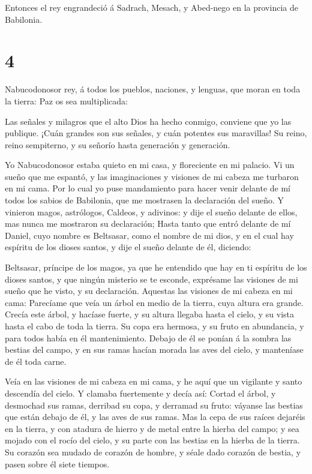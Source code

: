  Entonces el rey engrandeció á Sadrach, Mesach, y Abed-nego
en la provincia de Babilonia.

\hypertarget{section-3}{%
\section{4}\label{section-3}}

 Nabucodonosor rey, á todos los pueblos, naciones, y
lenguas, que moran en toda la tierra: Paz os sea multiplicada:

 Las señales y milagros que el alto Dios ha hecho conmigo,
conviene que yo las publique.  ¡Cuán grandes son sus
señales, y cuán potentes sus maravillas! Su reino, reino sempiterno, y
su señorío hasta generación y generación.

 Yo Nabucodonosor estaba quieto en mi casa, y floreciente en
mi palacio.  Vi un sueño que me espantó, y las imaginaciones
y visiones de mi cabeza me turbaron en mi cama.  Por lo cual
yo puse mandamiento para hacer venir delante de mí todos los sabios de
Babilonia, que me mostrasen la declaración del sueño.  Y
vinieron magos, astrólogos, Caldeos, y adivinos: y dije el sueño delante
de ellos, mas nunca me mostraron su declaración;  Hasta
tanto que entró delante de mí Daniel, cuyo nombre es Beltsasar, como el
nombre de mi dios, y en el cual hay espíritu de los dioses santos, y
dije el sueño delante de él, diciendo:

 Beltsasar, príncipe de los magos, ya que he entendido que
hay en ti espíritu de los dioses santos, y que ningún misterio se te
esconde, exprésame las visiones de mi sueño que he visto, y su
declaración.  Aquestas las visiones de mi cabeza en mi
cama: Parecíame que veía un árbol en medio de la tierra, cuya altura era
grande.  Crecía este árbol, y hacíase fuerte, y su altura
llegaba hasta el cielo, y su vista hasta el cabo de toda la tierra.
 Su copa era hermosa, y su fruto en abundancia, y para
todos había en él mantenimiento. Debajo de él se ponían á la sombra las
bestias del campo, y en sus ramas hacían morada las aves del cielo, y
manteníase de él toda carne.

 Veía en las visiones de mi cabeza en mi cama, y he aquí
que un vigilante y santo descendía del cielo.  Y clamaba
fuertemente y decía así: Cortad el árbol, y desmochad sus ramas,
derribad su copa, y derramad su fruto: váyanse las bestias que están
debajo de él, y las aves de sus ramas.  Mas la cepa de sus
raíces dejaréis en la tierra, y con atadura de hierro y de metal entre
la hierba del campo; y sea mojado con el rocío del cielo, y su parte con
las bestias en la hierba de la tierra.  Su corazón sea
mudado de corazón de hombre, y séale dado corazón de bestia, y pasen
sobre él siete tiempos.

